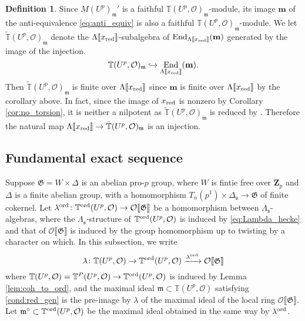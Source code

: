 \documentclass[leqno]{amsart}
\theoremstyle{definition}
\newtheorem{defn}[thm]{Definition}
\theoremstyle{remark}
\newcommand{\oo}{\mathcal{O}}
\newcommand{\Zp}{\mathbf{Z}_p}
\DeclareMathOperator{\End}{End}
\newcommand{\fm}{\mathfrak{m}}
\newcommand{\fs}{\mathfrak{s}}
\newcommand{\xx}{x_\textnormal{red}}
\newcommand{\fG}{\mathfrak{G}}
\newcommand{\TT}{\mathbb{T}} %
\newcommand{\ord}{\textnormal{ord}} %
\begin{document}
\begin{defn}

Since $M(U^p)_{\fm}'$ is a faithful $\TT(U^p,\oo)_{\fm}$-module,
its image 
$\mathbf{m}$ of the anti-equivalence \eqref{eq:anti_equiv}
is also a faithful $\TT(U^p,\oo)_{\fm}$-module.
We let  $\tilde{\TT}(U^p,\oo)_\fm$
denote the $\Lambda\llbracket\xx\rrbracket$-subalgebra
of $\End_{\Lambda\llbracket\xx\rrbracket}(\mathbf{m})$
generated by the image of the injection.
\[
\TT(U^p,\oo)_\fm\hookrightarrow 
\End_{\Lambda\llbracket\xx\rrbracket}(\mathbf{m}).
\]
Then $\tilde{\TT}(U^p,\oo)_\fm$
is finite over $\Lambda\llbracket\xx\rrbracket$
since $\mathbf{m}$
is finite over $\Lambda\llbracket\xx\rrbracket$
by the corollary above.
In fact, 
since the image of $\xx$ is nonzero by
Corollary \ref{cor:no_torsion},
it is neither a nilpotent
as $\tilde{\TT}(U^p,\oo)_\fm$ is reduced by \cite[Lem 2.14]{ger}.
Therefore the natural map 
$\Lambda\llbracket\xx\rrbracket\to\tilde{\TT}(U^p,\oo)_\fm$
is an injection.
\end{defn}

\subsection{Fundamental exact sequence}
\label{sub:fund_exact_sequence}

Suppose $\fG=W\times \Delta$ is an abelian pro-$p$ group,
where $W$ is fintie free over $\Zp$
and $\Delta$ is a finite abelian group,
with a homomorphism
$T_n(p^1)\times\Delta_\fs\to \fG$ 
of finite cokernel.
Let  $\lambda^{\ord}\colon 
\TT^{\ord}(U^p,\oo)\to \oo\llbracket\fG\rrbracket$
be a homomorphism 
between $\Lambda_{\fs}$-algebras,
where the $\Lambda_{\fs}$-structure
of $\TT^{\ord}(U^p,\oo)$
is induced by \eqref{eq:Lambda_hecke}
and that of $\oo\llbracket\fG\rrbracket$
is induced by the group homomorphism
up to twisting by a character on which.
In this subsection, we write
\begin{equation}
    \lambda\colon 
    \TT(U^p,\oo)\to
    \TT^{\ord}(U^p,\oo)\xrightarrow{\lambda^{\ord}}
    \oo\llbracket\fG\rrbracket
\end{equation}
where $\TT(U^p,\oo)=\TT^P(U^p,\oo)\to \TT^{\ord}(U^p,\oo)$ is
induced by Lemma \ref{lem:coh_to_ord},
and the maximal ideal $\fm\subset \TT(U^p,\oo)$
satisfying \eqref{cond:red_gen}
is the pre-image by $\lambda$
of the maximal ideal of the local ring
$\oo\llbracket\fG\rrbracket$.
Let $\fm^\circ\subset \TT^{\ord}(U^p,\oo)$
be the maximal ideal obtained in the same way by $\lambda^{\ord}$.
\end{document}
